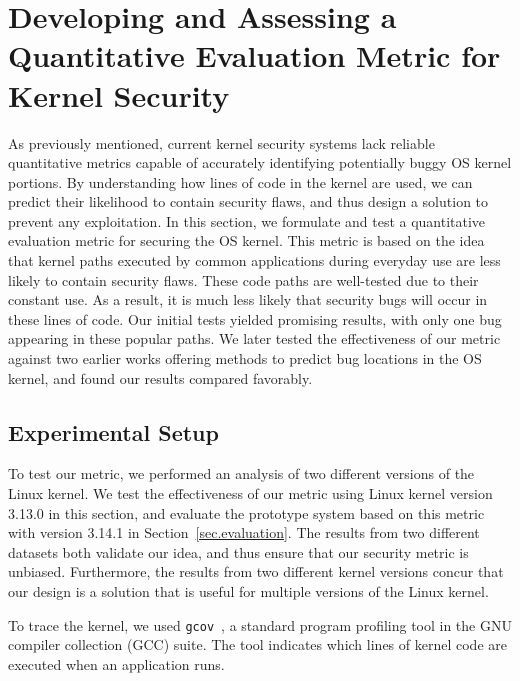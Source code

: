 \section{Developing and Assessing a Quantitative Evaluation Metric for Kernel Security}
\label{sec.metric}

As previously mentioned, current kernel
security systems lack reliable quantitative metrics capable of
 accurately identifying potentially buggy OS kernel portions. By understanding
how lines of code in the kernel are used, we can predict their likelihood to contain
 security flaws, and thus
design a solution to prevent any exploitation.
In this section, we formulate and test
a quantitative evaluation metric for securing the OS kernel.
This metric is based on the idea that kernel paths executed by common applications
during everyday use are less likely to contain security flaws.
These code paths are well-tested due to their constant use. As a result,
it is much less likely that security bugs will occur in these lines of code.
Our initial tests yielded promising results, with only one
bug appearing in these popular paths.  We later tested the effectiveness
of our metric against two earlier works offering methods to predict bug
locations in the OS kernel, and found our results compared favorably.

\subsection{Experimental Setup}\label{sec-setup}
To test our metric, we performed an analysis of two different versions of
the Linux kernel.
We test the effectiveness of our metric using Linux kernel version 3.13.0 in this
section, and evaluate the prototype system based on this metric with version 3.14.1 in
Section~\ref{sec.evaluation}. The results from two different datasets both validate
our idea, and thus ensure that our security metric is unbiased. Furthermore,
the results from two different kernel versions concur that our design is
a solution that is useful for multiple versions of the Linux kernel.

To trace the kernel, we used \texttt{gcov}~\cite{gcov}, a standard program profiling
tool in the GNU compiler collection (GCC) suite. The tool indicates which lines of kernel
code are executed when an application runs.


